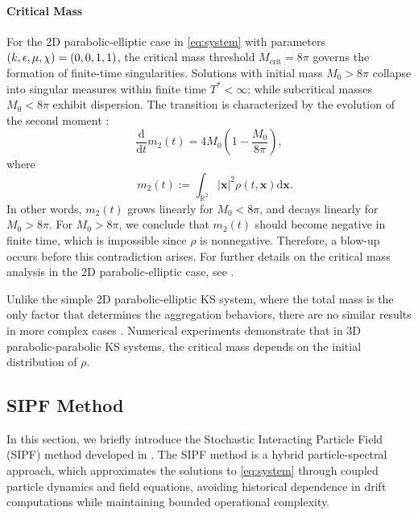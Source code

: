 \documentclass[review,onefignum,onetabnum]{siamart250211}
\begin{document}
\paragraph{Critical Mass}
For the 2D parabolic-elliptic case in \eqref{eq:system} with parameters \((k, \epsilon, \mu,\\ \chi) = (0, 0, 1, 1)\), the critical mass threshold \(M_{\text{crit}} = 8\pi\) governs the formation of finite-time singularities. Solutions with initial mass \(M_0  > 8\pi\) collapse into singular measures within finite time \(T^* < \infty\); while subcritical masses \(M_0 < 8\pi\) exhibit dispersion. The transition is characterized by the evolution of the second moment \cite{Transport}:  
\begin{equation}
\label{eq:second_moment}
\frac{\mathrm{d}}{\mathrm{d}t}m_2(t) = 4M_0\left(1 - \frac{M_0}{8\pi}\right), 
\end{equation}
where
\begin{equation}
\quad m_2(t) := \int_{\mathbb{R}^2} |\mathbf{x}|^2\rho(t,\mathbf{x})\mathrm{d}\mathbf{x}.
\end{equation}
In other words, \(m_2(t)\) grows linearly for \(M_0 < 8\pi\), and decays linearly for \(M_0 > 8\pi\). 
For \(M_0 > 8\pi\), we conclude that \(m_2(t)\) should become negative in finite time, which is impossible since \(\rho\) is nonnegative. Therefore, a blow-up occurs before this contradiction arises. For further details on the critical mass analysis in the 2D parabolic-elliptic case, see \cite{collapsing}.

Unlike the simple 2D parabolic-elliptic KS system, where the total mass is the only factor that determines the aggregation behaviors, there are no similar results in more complex cases \cite{he2022fast}. Numerical experiments \cite{SIPF1} demonstrate that in 3D parabolic-parabolic KS systems, the critical mass depends on the initial distribution of \(\rho\).

\subsection{SIPF Method}
In this section, we briefly introduce the Stochastic Interacting Particle Field (SIPF) method developed in \cite{SIPF1}. The SIPF method is a hybrid particle-spectral approach, which approximates the solutions to \eqref{eq:system} through coupled particle dynamics and field equations, avoiding historical dependence in drift computations while maintaining bounded operational complexity.
\end{document}
